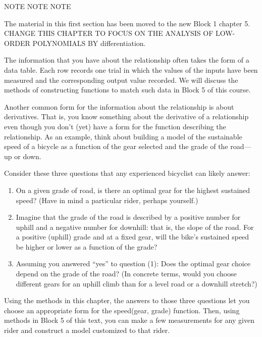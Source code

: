 \documentclass[
  letterpaper,
  DIV=11,
  numbers=noendperiod,
  oneside]{scrreprt}
\providecommand{\tightlist}{%
  \setlength{\itemsep}{0pt}\setlength{\parskip}{0pt}}
\begin{document}
NOTE NOTE NOTE

The material in this first section has been moved to the new Block 1
chapter 5. CHANGE THIS CHAPTER TO FOCUS ON THE ANALYSIS OF LOW-ORDER
POLYNOMIALS BY differentiation.

The information that you have about the relationship often takes the
form of a data table. Each row records one trial in which the values of
the inputs have been measured and the corresponding output value
recorded. We will discuss the methods of constructing functions to match
such data in Block 5 of this course.

Another common form for the information about the relationship is about
derivatives. That is, you know something about the derivative of a
relationship even though you don't (yet) have a form for the function
describing the relationship. As an example, think about building a model
of the sustainable speed of a bicycle as a function of the gear selected
and the grade of the road---up or down.

Consider these three questions that any experienced bicyclist can likely
answer:

\begin{enumerate}
\def\labelenumi{\arabic{enumi}.}
\tightlist
\item
  On a given grade of road, is there an optimal gear for the highest
  sustained speed? (Have in mind a particular rider, perhaps yourself.)
\item
  Imagine that the grade of the road is described by a positive number
  for uphill and a negative number for downhill: that is, the slope of
  the road. For a positive (uphill) grade and at a fixed gear, will the
  bike's sustained speed be higher or lower as a function of the
  grade?
\item
  Assuming you answered ``yes'' to question (1): Does the optimal gear
  choice depend on the grade of the road? (In concrete terms, would you
  choose different gears for an uphill climb than for a level road or a
  downhill stretch?)
\end{enumerate}

Using the methods in this chapter, the answers to those three questions
let you choose an appropriate form for the speed(gear, grade) function.
Then, using methods in Block 5 of this text, you can make a few
measurements for any given rider and construct a model customized to
that rider.
\end{document}
